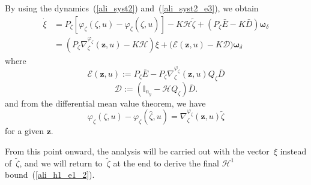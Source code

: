 \documentclass{ifacconf}
\def\eqref#1{(\ref{#1})}
\begin{document}
By using the dynamics~\eqref{ali_syst2} and~\eqref{ali_syst2_e3}, we obtain
\begin{align*}
\dot{\xi} &= P_{\zeta}\!\left[\varphi_{\zeta}(\zeta,u)-\varphi_{\zeta}(\hat{\zeta},u)\right]
-K\mathcal{H}\tilde{\zeta}
+\left(P_{\zeta}\bar{E}-K\bar{D}\right)\bm{\omega}_{\delta} \\
&= \left(P_{\zeta}\nabla^{\varphi_{\zeta}}_{\zeta}(\bm{z},u)-K\mathcal{H}\right)\xi
+\Big(\mathcal{E}(\bm{z},u)-K\mathcal{D}\Big)\bm{\omega}_{\delta}
\end{align*}
where
$$
\mathcal{E}\left( \bm{z},u\right) := P_{\zeta}\bar{E} - P_{\zeta} \nabla^{\varphi_{\zeta}}_{\zeta}(\bm{z},u) Q_{\zeta} \bar{D}
$$
$$
\mathcal{D} := \left( \mathbb{I}_{n_y} - \mathcal{H} Q_{\zeta} \right) \bar{D}.
$$
and from the differential mean value theorem, we have
$$
\varphi_{\zeta}\left(\zeta,u \right) - \varphi_{\zeta}\left(\hat{\zeta},u \right) = \nabla^{\varphi_{\zeta}}_{\zeta}(\bm{z},u) \tilde{\zeta}
$$
for a given $\bm{z}$.

From this point onward, the analysis will be carried out with the vector~$\xi$ instead of~$\tilde{\zeta}$, and we will return to~$\tilde{\zeta}$ at the end to derive the final $\mathcal{H}^{1}$ bound~\eqref{ali_h1_e1_2}.

\vspace*{-0.1cm}
\end{document}
